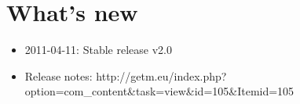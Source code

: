 
\section{What's new}

\begin{itemize}
   \item{2011-04-11: Stable release v2.0}
   \item{Release notes: http://getm.eu/index.php?option=com\_content\&task=view\&id=105\&Itemid=105}
\end{itemize}
